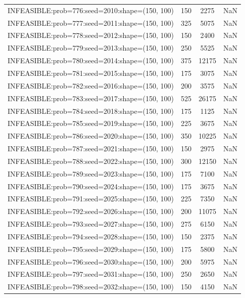 \begin{longtable}{lccc}
INFEASIBLE:prob=776:seed=2010:shape=(150, 100) &      150 &  2275 &    NaN \\
INFEASIBLE:prob=777:seed=2011:shape=(150, 100) &      325 &  5075 &    NaN \\
INFEASIBLE:prob=778:seed=2012:shape=(150, 100) &      150 &  2400 &    NaN \\
INFEASIBLE:prob=779:seed=2013:shape=(150, 100) &      250 &  5525 &    NaN \\
INFEASIBLE:prob=780:seed=2014:shape=(150, 100) &      375 & 12175 &    NaN \\
INFEASIBLE:prob=781:seed=2015:shape=(150, 100) &      175 &  3075 &    NaN \\
INFEASIBLE:prob=782:seed=2016:shape=(150, 100) &      200 &  3575 &    NaN \\
INFEASIBLE:prob=783:seed=2017:shape=(150, 100) &      525 & 26175 &    NaN \\
INFEASIBLE:prob=784:seed=2018:shape=(150, 100) &      175 &  1125 &    NaN \\
INFEASIBLE:prob=785:seed=2019:shape=(150, 100) &      225 &  3675 &    NaN \\
INFEASIBLE:prob=786:seed=2020:shape=(150, 100) &      350 & 10225 &    NaN \\
INFEASIBLE:prob=787:seed=2021:shape=(150, 100) &      150 &  2975 &    NaN \\
INFEASIBLE:prob=788:seed=2022:shape=(150, 100) &      300 & 12150 &    NaN \\
INFEASIBLE:prob=789:seed=2023:shape=(150, 100) &      175 &  7100 &    NaN \\
INFEASIBLE:prob=790:seed=2024:shape=(150, 100) &      175 &  3675 &    NaN \\
INFEASIBLE:prob=791:seed=2025:shape=(150, 100) &      225 &  7350 &    NaN \\
INFEASIBLE:prob=792:seed=2026:shape=(150, 100) &      200 & 11075 &    NaN \\
INFEASIBLE:prob=793:seed=2027:shape=(150, 100) &      275 &  6150 &    NaN \\
INFEASIBLE:prob=794:seed=2028:shape=(150, 100) &      150 &  2375 &    NaN \\
INFEASIBLE:prob=795:seed=2029:shape=(150, 100) &      175 &  5800 &    NaN \\
INFEASIBLE:prob=796:seed=2030:shape=(150, 100) &      200 &  5975 &    NaN \\
INFEASIBLE:prob=797:seed=2031:shape=(150, 100) &      250 &  2650 &    NaN \\
INFEASIBLE:prob=798:seed=2032:shape=(150, 100) &      150 &  4150 &    NaN \\

\end{longtable}
